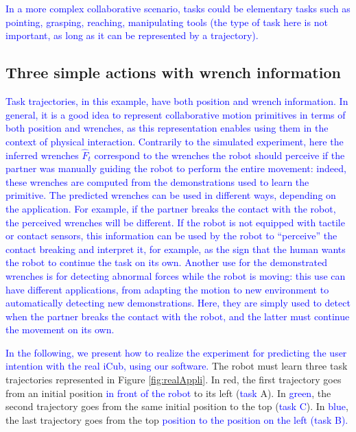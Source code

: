 \documentclass[utf8]{frontiersSCNS} %
\newcommand{\rev}[1]{\textcolor{blue}{#1}}
\begin{document}
\rev{In a more complex collaborative scenario, tasks could be elementary tasks such as pointing, grasping, reaching, manipulating tools (the type of task here is not important, as long as it can be represented by a trajectory).}


\subsection{Three simple actions with wrench information}

\rev{Task trajectories, in this example, have both position and wrench information.
In general, it is a good idea to represent collaborative motion primitives in terms of both position and wrenches, as this representation enables using them in the context of physical interaction.
 Contrarily to the simulated experiment, here the inferred wrenches $\hat{F}_t$ correspond to the wrenches the robot should perceive if the partner was manually guiding the robot to perform the entire movement: indeed, these wrenches are computed from the demonstrations used to learn the primitive. 
The predicted wrenches can be used in different ways, depending on the application.
For example, if the partner breaks the contact with the robot, the perceived wrenches will be different. If the robot is not equipped with tactile or contact sensors, this information can be used by the robot to ``perceive'' the contact breaking and interpret it, for example, as the sign that the human wants the robot to continue the task on its own. 
Another use for the demonstrated wrenches is for detecting abnormal forces while the robot is moving: this use can have different applications, from adapting the motion to new environment to automatically detecting new demonstrations. 
Here, they are simply used to detect when the partner breaks the contact with the robot, and the latter must continue the movement on its own.
}

\rev{In the following, we present how to realize the experiment for predicting the user intention with the real iCub, using our software.}
The robot must learn three task trajectories represented in Figure \ref{fig:realAppli}. In red, the first trajectory goes from an initial position \rev{in front of the robot} to its left (\rev{task} A). In \rev{green}, the second trajectory goes from the same initial position to the top (\rev{task C}). In \rev{blue}, the last trajectory goes from the top \rev{position to the position on the left (task B).}
\end{document}
